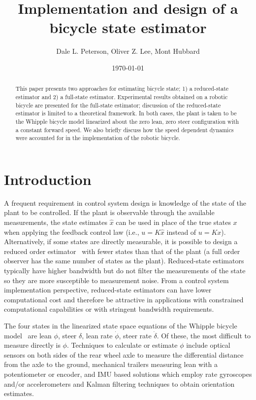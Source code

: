 \documentclass[letterpaper,11pt]{article}
\begin{document}
\title{Implementation and design of a bicycle state estimator}
\author{Dale L. Peterson, Oliver Z. Lee, Mont Hubbard}
\date{\today}
\maketitle

\begin{abstract}
This paper presents two approaches for estimating bicycle state; 1) a
reduced-state estimator and 2) a full-state estimator. Experimental results
obtained on a robotic bicycle are presented for the full-state estimator;
discussion of the reduced-state estimator is limited to a theoretical
framework. In both cases, the plant is taken to be the Whipple bicycle model
linearized about the zero lean, zero steer configuration with a constant
forward speed.  We also briefly discuss how the speed dependent dynamics were
accounted for in the implementation of the robotic bicycle.
\end{abstract}

\section{Introduction} \label{sec:introduction}
A frequent requirement in control system design is knowledge of the state of
the plant to be controlled. If the plant is observable through the available
measurements, the state estimates $\hat{x}$ can be used in place of the true
states $x$ when applying the feedback control law (i.e., $u=K\hat{x}$ instead
of $u=Kx$). Alternatively, if some states are directly measurable, it is
possible to design a reduced order estimator~\cite{Bryson1970} with fewer
states than that of the plant (a full order observer has the same number of
states as the plant).  Reduced-state estimators typically have higher bandwidth
but do not filter the measurements of the state so they are more susceptible to
measurement noise.  From a control system implementation perspective,
reduced-state estimators can have lower computational cost and therefore be
attractive in applications with constrained computational capabilities or with
stringent bandwidth requirements.

The four states in the linearized state space equations of the Whipple bicycle
model~\cite{Meijaard2007} are lean $\phi$, steer $\delta$, lean rate $\dot{\phi}$, steer rate
$\dot{\delta}$.  Of these, the most difficult to measure directly is $\phi$.
Techniques to calculate or estimate $\phi$ include optical sensors on both sides
of the rear wheel axle to measure the differential distance from the axle to the ground,
mechanical trailers measuring lean with a potentiometer or encoder, and IMU
based solutions which employ rate gyroscopes and/or accelerometers and Kalman
filtering techniques to obtain orientation estimates\cite{Boniolo2008}.
\end{document}
